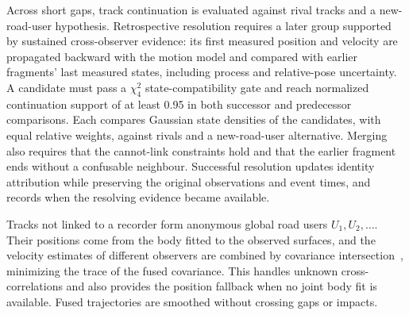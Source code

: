 Across short gaps, track continuation is evaluated against rival tracks
and a new-road-user hypothesis. Retrospective resolution requires a later
group supported by sustained cross-observer evidence: its first measured
position and velocity are propagated backward with the motion model and
compared with earlier fragments' last measured states, including process
and relative-pose uncertainty. A candidate must pass a $\chi^2_4$
state-compatibility gate and reach normalized continuation support of at
least 0.95 in both successor and predecessor comparisons. Each compares
Gaussian state densities of the candidates, with equal relative weights,
against rivals and a new-road-user alternative. Merging also requires
that the cannot-link constraints hold and that the earlier fragment ends
without a confusable neighbour. Successful resolution updates identity
attribution while preserving the original observations and event times,
and records when the resolving evidence became available.

Tracks not linked to a recorder form anonymous global road users
$U_1,U_2,\ldots$. Their positions come from the body fitted to the
observed surfaces, and the velocity estimates of different observers
are combined by covariance intersection~\cite{julier1997intersection},
minimizing the trace of the fused covariance. This handles unknown
cross-correlations and also provides the position fallback when no joint
body fit is available. Fused trajectories are smoothed without crossing
gaps or impacts.

